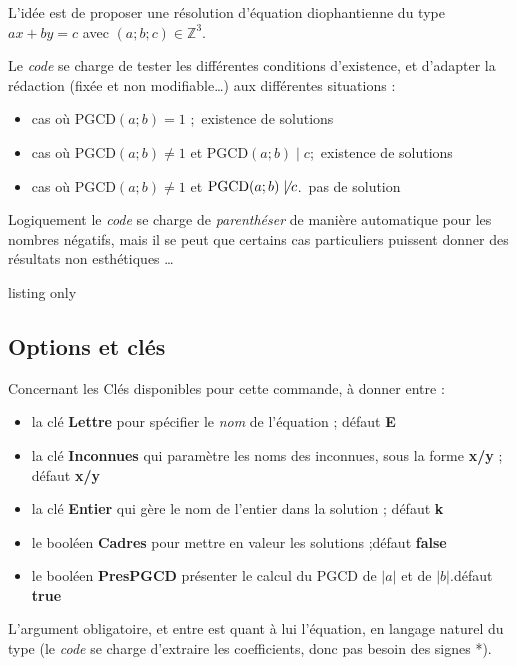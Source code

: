 \documentclass[a4paper,french,11pt]{article}
\newcommand\ctex[1]{\tcbox[vignettelatex]{#1}}
\newcommand\Cle[1]{{\bfseries\sffamily\textlangle #1\textrangle}}
\begin{document}
\begin{tipblock}
L'idée est de proposer une résolution d'équation diophantienne du type $ax+by=c$ avec $(a;b;c) \in \mathbb{Z}^3$.

\smallskip

Le \textit{code} se charge de tester les différentes conditions d'existence, et d'adapter la rédaction (fixée et non modifiable\ldots) aux différentes situations :

\begin{itemize}
	\item cas où $\text{PGCD}(a;b)=1$ ;\hfill~existence de solutions
	\item cas où $\text{PGCD}(a;b) \neq 1$ et $\text{PGCD}(a;b) \mid c$;\hfill~existence de solutions
	\item cas où $\text{PGCD}(a;b) \neq 1$ et $\text{PGCD}(a;b) \not\mid c$.\hfill~pas de solution
\end{itemize}
\vspace*{-\baselineskip}\leavevmode
\end{tipblock}

\begin{warningblock}
Logiquement le \textit{code} se charge de \textit{parenthéser} de manière automatique pour les nombres négatifs, mais il se peut que certains cas particuliers puissent donner des résultats \og non esthétiques \fg{}\ldots
\end{warningblock}

\begin{PresCodeTexPL}{listing only}
\end{PresCodeTexPL}

\subsection{Options et clés}

\begin{cautionblock}
Concernant les Clés disponibles pour cette commande, à donner entre \ctex{[...]} :

\begin{itemize}
	\item la clé \Cle{Lettre} pour spécifier le \textit{nom} de l'équation ; \hfill{}défaut \Cle{E}
	\item la clé \Cle{Inconnues} qui paramètre les noms des inconnues, sous la forme \Cle{x/y} ; \hfill{}défaut \Cle{x/y}
	\item la clé \Cle{Entier} qui gère le nom de l'entier dans la solution ; \hfill{}défaut \Cle{k}
	\item le booléen \Cle{Cadres} pour mettre en valeur les solutions ;\hfill{}défaut \Cle{false}
	\item le booléen \Cle{PresPGCD} présenter le calcul du PGCD de $|a|$ et de $|b|$.\hfill{}défaut \Cle{true}
\end{itemize}

L'argument obligatoire, et entre \ctex{\{...\}} est quant à lui l'équation, en langage \og naturel \fg{} du type \ctex{ax+by=c} (le \textit{code} se charge d'extraire les coefficients, donc pas besoin des signes *).
\end{cautionblock}
\end{document}
